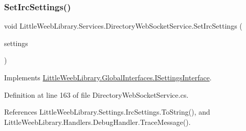 \mbox{\label{class_little_weeb_library_1_1_services_1_1_directory_web_socket_service_a223c62acb36e1ac602552fa1ecf67057}} 
\subsubsection{\texorpdfstring{Set\+Irc\+Settings()}{SetIrcSettings()}}
{\footnotesize\ttfamily void Little\+Weeb\+Library.\+Services.\+Directory\+Web\+Socket\+Service.\+Set\+Irc\+Settings (\begin{DoxyParamCaption}\item[{\mbox{\hyperlink{class_little_weeb_library_1_1_settings_1_1_irc_settings}{Irc\+Settings}}}]{settings }\end{DoxyParamCaption})}



Implements \mbox{\hyperlink{interface_little_weeb_library_1_1_global_interfaces_1_1_i_settings_interface_a9ddf06e247a96d757482b37ddb070e3d}{Little\+Weeb\+Library.\+Global\+Interfaces.\+I\+Settings\+Interface}}.



Definition at line 163 of file Directory\+Web\+Socket\+Service.\+cs.



References Little\+Weeb\+Library.\+Settings.\+Irc\+Settings.\+To\+String(), and Little\+Weeb\+Library.\+Handlers.\+Debug\+Handler.\+Trace\+Message().


